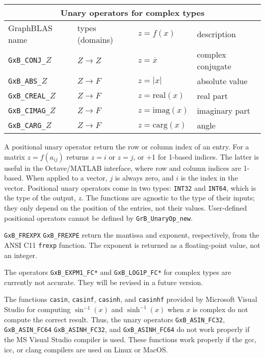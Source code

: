 \documentclass[12pt]{article}
\begin{document}
{\begin{tabular}{|llll|}
\hline
\multicolumn{4}{|c|}{Unary operators for complex types} \\
\hline
GraphBLAS name          & types (domains)   & $z=f(x)$      & description \\
\hline
\verb'GxB_CONJ_'$Z$    & $Z \rightarrow Z$ & $z = \overline{x}$     & complex conjugate \\
\verb'GxB_ABS_'$Z$     & $Z \rightarrow F$ & $z = |x|$              & absolute value \\
\verb'GxB_CREAL_'$Z$   & $Z \rightarrow F$ & $z = \mbox{real}(x)$   & real part \\
\verb'GxB_CIMAG_'$Z$   & $Z \rightarrow F$ & $z = \mbox{imag}(x)$   & imaginary part \\
\verb'GxB_CARG_'$Z$    & $Z \rightarrow F$ & $z = \mbox{carg}(x)$   & angle \\
\hline
\end{tabular}
}
\vspace{0.2in}

A positional unary operator return the row or column index of an entry.  For a
matrix $z=f(a_{ij})$ returns $z = i$ or $z = j$, or +1 for 1-based indices.
The latter is useful in the Octave/MATLAB interface, where row and column indices are
1-based.  When applied to a vector, $j$ is always zero, and $i$ is the index in
the vector.  Positional unary operators come in two types: \verb'INT32' and
\verb'INT64', which is the type of the output, $z$.  The functions are agnostic
to the type of their inputs; they only depend on the position of the entries,
not their values.
User-defined positional operators cannot be defined by \verb'GrB_UnaryOp_new'.

\verb'GxB_FREXPX' \verb'GxB_FREXPE' return the mantissa and exponent,
respectively, from the ANSI C11 \verb'frexp' function.  The exponent is
returned as a floating-point value, not an integer.

The operators \verb'GxB_EXPM1_FC*' and \verb'GxB_LOG1P_FC*' for complex
types are currently not accurate.  They will be revised in a future version.

The functions \verb'casin', \verb'casinf', \verb'casinh', and \verb'casinhf'
provided by Microsoft Visual Studio for computing $\sin^{-1}(x)$ and
$\sinh^{-1}(x)$ when $x$ is complex do not compute the correct result.  Thus,
the unary operators \verb'GxB_ASIN_FC32', \verb'GxB_ASIN_FC64'
\verb'GxB_ASINH_FC32', and \verb'GxB_ASINH_FC64' do not work properly if the MS
Visual Studio compiler is used.  These functions work properly if the gcc, icc,
or clang compilers are used on Linux or MacOS.
\end{document}
